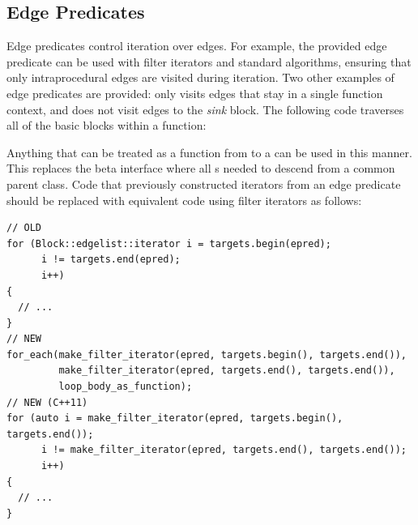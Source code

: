 \subsection{Edge Predicates}
\label{sec:pred}


Edge predicates control iteration over edges. For example, the provided
 edge predicate can be used with filter iterators and standard
algorithms, ensuring that only intraprocedural edges are visited during
iteration. Two other examples of edge predicates are provided:
 only visits edges that stay in a single
function context, and  does not visit edges to
the \emph{sink} block.  The following code traverses
all of the basic blocks within a
function:



Anything that can be treated as a function from  to a  can be used in this manner. This replaces the beta interface where all
s needed to descend from a common parent class. Code that previously constructed iterators from an edge predicate should be replaced
with equivalent code using filter iterators as follows:

\begin{lstlisting}
// OLD
for (Block::edgelist::iterator i = targets.begin(epred);
      i != targets.end(epred);
      i++)
{
  // ...
}
// NEW
for_each(make_filter_iterator(epred, targets.begin(), targets.end()),
         make_filter_iterator(epred, targets.end(), targets.end()),
         loop_body_as_function);
// NEW (C++11)
for (auto i = make_filter_iterator(epred, targets.begin(), targets.end());
      i != make_filter_iterator(epred, targets.end(), targets.end());
      i++)
{
  // ...
}
\end{lstlisting}
